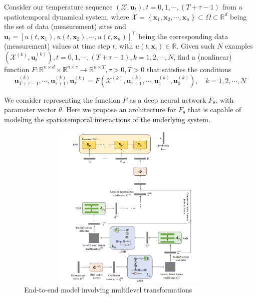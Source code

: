 \documentclass{apmcmthesis}
\begin{document}
Consider our temperature sequence $\left(\mathcal{X}, \mathbf{u}_t\right), t=0,1, \cdots,(T+\tau-1)$ from a spatiotemporal dynamical system, where $\mathcal{X}=\left\{\mathbf{x}_1, \mathbf{x}_2, \cdots, \mathbf{x}_n\right\} \subset \Omega \subset \mathbb{R}^d$ being the set of data (measurement) sites and $\mathbf{u}_t=\left[u\left(t, \mathbf{x}_1\right), u\left(t, \mathbf{x}_2\right), \cdots, u\left(t, \mathbf{x}_n\right)\right]^{\top}$ being the corresponding data (measurement) values at time step $t$, with $u\left(t, \mathbf{x}_i\right) \in \mathbb{R}$. Given such $N$ examples $\left(\mathcal{X}^{(k)}, \mathbf{u}_t^{(k)}\right), t=0,1, \cdots,(T+\tau-1), k=1,2, \cdots, N$, find a (nonlinear) function $F: \mathbb{R}^{n \times d} \times \mathbb{R}^{n \times \tau} \rightarrow \mathbb{R}^{n \times T}, \tau>0, T>0$ that satisfies the conditions
$$
\mathbf{u}_{T+\tau-1}^{(k)}, \cdots, \mathbf{u}_{\tau+1}^{(k)}, \mathbf{u}_\tau^{(k)}=F\left(\mathcal{X}^{(k)}, \mathbf{u}_{\tau-1}^{(k)}, \cdots, \mathbf{u}_1^{(k)}, \mathbf{u}_0^{(k)}\right), \quad k=1,2, \cdots, N
$$

We consider representing the function $F$ as a deep neural network $F_\theta$, with parameter vector $\theta$. Here we propose an architecture for $F_\theta$ that is capable of modeling the spatiotemporal interactions of the underlying system. 
\begin{figure}
    \centering
    \includegraphics[width=13cm,height=8cm]{APMCMThesis/figures/umtn.png}
    \caption{End-to-end model involving multilevel transformations}
    \label{fig:my_label}
\end{figure}
\end{document}

